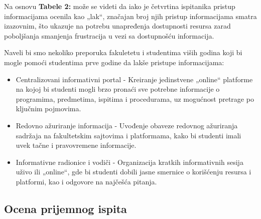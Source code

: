 \documentclass[a4paper]{article}
\begin{document}
Na osnovu \textbf{Tabele 2:} može se videti da iako je četvrtina ispitanika pristup informacijama ocenila kao „lak“, značajan broj njih pristup informacijama smatra izazovnim, što ukazuje na potrebu unapređenja dostupnosti resursa zarad poboljšanja smanjenja frustracija u vezi sa dostupnošću informacija.\\

\captionsetup[table]{skip=10pt}
\begin{table}[H]
\centering %
\caption{Pristup informacijama o studijskom programu}
\end{table}

Naveli bi smo nekoliko preporuka fakuletetu i studentima viših godina koji bi mogle pomoći studentima prve godine da lakše pristupe informacijama:\\

\begin{itemize}
    \item Centralizovani informativni portal - Kreiranje jedinstvene „online“ platforme na kojoj bi studenti mogli brzo pronaći sve potrebne informacije o programima, predmetima, ispitima i procedurama, uz mogućnost pretrage po ključnim pojmovima.
    \item Redovno ažuriranje informacija - Uvođenje obaveze redovnog ažuriranja sadržaja na fakultetskim sajtovima i platformama, kako bi studenti imali uvek tačne i pravovremene informacije.
    \item Informativne radionice i vodiči - Organizacija kratkih informativnih sesija uživo ili „online“, gde bi studenti dobili jasne smernice o korišćenju resursa i platformi, kao i odgovore na najčešća pitanja.\\
\end{itemize}

\subsection{\textbf{Ocena prijemnog ispita} }
\end{document}
